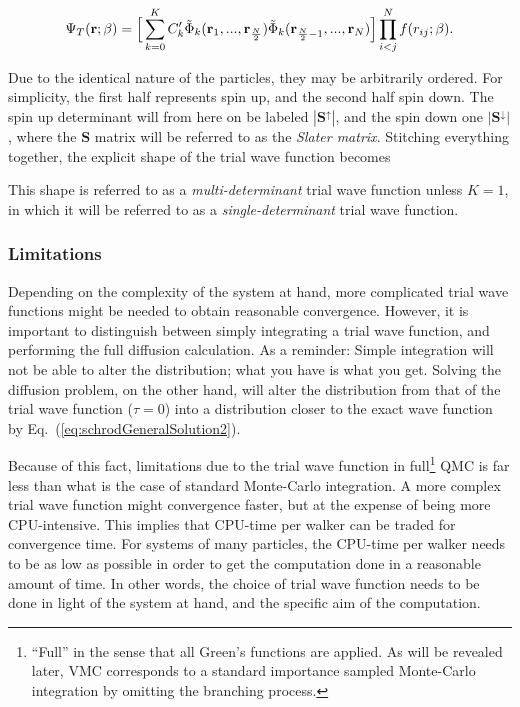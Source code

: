 \begin{equation}
 \Psi_T(\mathbf{r}; \beta) = \Big[\sum_{k=0}^K C_k'\tilde\Phi_k(\mathbf{r}_1, ..., \mathbf{r}_{\frac{N}{2}})\tilde\Phi_k(\mathbf{r}_{\frac{N}{2}-1}, ..., \mathbf{r}_{N})\Big]\prod_{i<j}^Nf(r_{ij}; \beta). \label{eq:splitSlater}
\end{equation}

Due to the identical nature of the particles, they may be arbitrarily ordered. For simplicity, the first half represents spin up, and the second half spin down. The spin up determinant will from here on be labeled $|\mathbf{S}^\uparrow|$, and the spin down one $|\mathbf{S}^\downarrow|$, where the $\mathbf{S}$ matrix will be referred to as the \textit{Slater matrix}. Stitching everything together, the explicit shape of the trial wave function becomes


This shape is referred to as a \textit{multi-determinant} trial wave function unless $K=1$, in which it will be referred to as a \textit{single-determinant} trial wave function.

\subsubsection{Limitations}

Depending on the complexity of the system at hand, more complicated trial wave functions might be needed to obtain reasonable convergence. However, it is important to distinguish between simply integrating a trial wave function, and performing the full diffusion calculation. As a reminder: Simple integration will not be able to alter the distribution; what you have is what you get. Solving the diffusion problem, on the other hand, will alter the distribution from that of the trial wave function ($\tau = 0$) into a distribution closer to the exact wave function by Eq.~(\ref{eq:schrodGeneralSolution2}). 

Because of this fact, limitations due to the trial wave function in full\footnote{``Full'' in the sense that all Green's functions are applied. As will be revealed later, VMC corresponds to a standard importance sampled Monte-Carlo integration by omitting the branching process.} QMC is far less than what is the case of standard Monte-Carlo integration. A more complex trial wave function might convergence faster, but at the expense of being more CPU-intensive. This implies that CPU-time per walker can be traded for convergence time. For systems of many particles, the CPU-time per walker needs to be as low as possible in order to get the computation done in a reasonable amount of time. In other words, the choice of trial wave function needs to be done in light of the system at hand, and the specific aim of the computation. 

